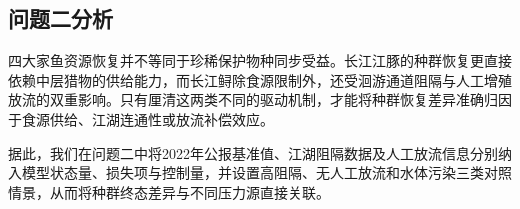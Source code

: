 \subsection{问题二分析}
四大家鱼资源恢复并不等同于珍稀保护物种同步受益。长江江豚的种群恢复更直接依赖中层猎物的供给能力，而长江鲟除食源限制外，还受洄游通道阻隔与人工增殖放流的双重影响。只有厘清这两类不同的驱动机制，才能将种群恢复差异准确归因于食源供给、江湖连通性或放流补偿效应。

据此，我们在问题二中将2022年公报基准值、江湖阻隔数据及人工放流信息分别纳入模型状态量、损失项与控制量，并设置高阻隔、无人工放流和水体污染三类对照情景，从而将种群终态差异与不同压力源直接关联。

